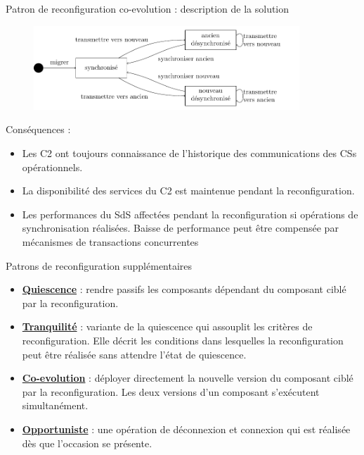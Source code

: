 \begin{frame}{Patron de reconfiguration co-evolution : description de la solution}
\begin{figure}
\centering
\includegraphics[width=10cm]{imgs/slide_solution_coevolution.pdf}
\end{figure}
Conséquences :
\begin{itemize}
\item Les C2 ont toujours connaissance de l’historique des communications des CSs opérationnels.
\item La disponibilité des services du C2 est maintenue pendant la reconfiguration.
\item Les performances du SdS affectées pendant la reconfiguration si opérations de synchronisation réalisées. Baisse de performance peut être compensée par mécanismes de transactions concurrentes
\end{itemize}
\end{frame}


\begin{frame}{Patrons de reconfiguration supplémentaires}
\begin{itemize}
\setlength\itemsep{0.7cm}
\item \underline{\textbf{Quiescence}} : rendre passifs
les composants dépendant du composant ciblé par la reconfiguration. 
\item \underline{\textbf{Tranquilité}} : variante de la quiescence qui assouplit
les critères de reconfiguration. Elle décrit les conditions dans
lesquelles la reconfiguration peut être réalisée sans attendre l'état de
quiescence.
\item \underline{\textbf{Co-evolution}} : déployer directement la nouvelle version du composant ciblé par la
reconfiguration. Les deux versions d'un
composant s'exécutent simultanément. 
\item \underline{\textbf{Opportuniste}} : une opération de
déconnexion et connexion qui est réalisée dès que l'occasion se
présente.  
\end{itemize}
\end{frame}
